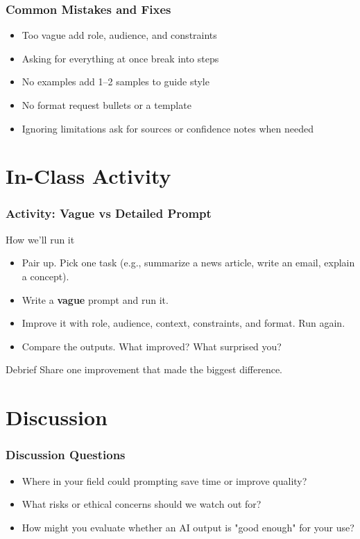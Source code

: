 \documentclass[11pt]{beamer}
\begin{document}
\begin{frame}
  \frametitle{Common Mistakes and Fixes}
  \begin{itemize}
    \item Too vague \textrightarrow{} add role, audience, and constraints
    \item Asking for everything at once \textrightarrow{} break into steps
    \item No examples \textrightarrow{} add 1--2 samples to guide style
    \item No format \textrightarrow{} request bullets or a template
    \item Ignoring limitations \textrightarrow{} ask for sources or confidence notes when needed
  \end{itemize}
\end{frame}

\section{In-Class Activity}
\begin{frame}
  \frametitle{Activity: Vague vs Detailed Prompt}
  \begin{block}{How we'll run it}
    \begin{itemize}
      \item Pair up. Pick one task (e.g., summarize a news article, write an email, explain a concept).
      \item Write a \textbf{vague} prompt and run it.
      \item Improve it with role, audience, context, constraints, and format. Run again.
      \item Compare the outputs. What improved? What surprised you?
    \end{itemize}
  \end{block}
  \begin{block}{Debrief}
    Share one improvement that made the biggest difference.
  \end{block}
\end{frame}

\section{Discussion}
\begin{frame}
  \frametitle{Discussion Questions}
  \begin{itemize}
    \item Where in your field could prompting save time or improve quality?
    \item What risks or ethical concerns should we watch out for?
    \item How might you evaluate whether an AI output is "good enough" for your use?
  \end{itemize}
\end{frame}
\end{document}
